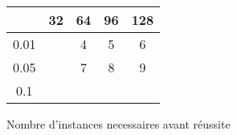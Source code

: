 \documentclass{article}		%
\theoremstyle{definition}
\theoremstyle{plain}
\begin{document}
\begin{figure}
\caption{Nombre d'instances necessaires avant réussite}
\begin{center}
\begin{tabular}{|c |c | c | c | c | }
\hline
   & 32 & 64 & 96 & 128 \\
\hline
 0.01  & &4 & 5 & 6 \\
\hline
  0.05 & &7 & 8 & 9 \\
\hline
 0.1 & & & & \\
 \hline
 \end{tabular}
\end{center}
\end{figure}



\end{document}
